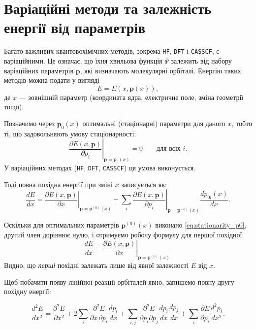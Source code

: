 \section{Варіаційні методи та залежність енергії від параметрів}

Багато важливих квантовохімічних методів, зокрема
\texttt{HF}, \texttt{DFT} і \texttt{CASSCF}, є варіаційними.
Це означає, що їхня хвильова функція $\Psi$ залежить від набору
варіаційних параметрів $\mathbf p$, які визначають молекулярні орбіталі.
Енергію таких методів можна подати у вигляді
\begin{equation}\label{eq:E_x_p}
	E = E(x, \mathbf p(x)),
\end{equation}
де $x$ --- зовнішній параметр (координата ядра, електричне поле,
зміна геометрії тощо).

Позначимо через \(\mathbf p_0(x)\) оптимальні (стаціонарні) параметри для даного \(x\),
тобто ті, що задовольняють умову стаціонарності:
\begin{equation}
	\left.\frac{\partial E(x,\mathbf p)}{\partial p_i}\right|_{\mathbf p=\mathbf p_0(x)} = 0
	\qquad\text{для всіх }i.
	\label{eq:stationarity_p0}
\end{equation}
У варіаційних методах (\texttt{HF}, \texttt{DFT}, \texttt{CASSCF}) ця умова виконується.


Тоді повна похідна енергії при зміні \(x\) записується як:
\begin{equation}
	\frac{dE}{dx}
	=
	\left.\frac{\partial E(x,\mathbf p)}{\partial x}\right|_{\mathbf p=\mathbf p^{(0)}(x)}
	+
	\sum_i
	\left.\frac{\partial E(x,\mathbf p)}{\partial p_i}\right|_{\mathbf p=\mathbf p^{(0)}(x)}
	\frac{d p_{0i}(x)}{dx}.
	\label{eq:dE_dx_general}
\end{equation}

Оскільки для оптимальних параметрів \(\mathbf p^{(0)}(x)\) виконано \eqref{eq:stationarity_p0},
другий член дорівнює нулю, і отримуємо робочу формулу для першої похідної:
\begin{equation}
	\frac{dE}{dx}
	=
	\left.\frac{\partial E(x,\mathbf p)}{\partial x}\right|_{\mathbf p=\mathbf p^{(0)}(x)}.
	\label{eq:dE_dx_stationary}
\end{equation}
Видно, що \emph{перші} похідні залежать лише від явної залежності $E$ від $x$.


Щоб побачити появу лінійної реакції орбіталей явно,
запишемо повну другу похідну енергії:

\begin{equation}
	\frac{d^2E}{dx^2}
	=
	\frac{\partial^2 E}{\partial x^2}
	+
	2 \sum_i
	\frac{\partial^2 E}{\partial x\,\partial p_i}\frac{dp_i}{dx}
	+
	\sum_{i,j}
	\frac{\partial^2 E}{\partial p_i \partial p_j}
	\frac{dp_i}{dx}\frac{dp_j}{dx}
	+
	\sum_i
	\frac{\partial E}{\partial p_i}\frac{d^2 p_i}{dx^2}.
	\label{eq:second_derivative_full}
\end{equation}




